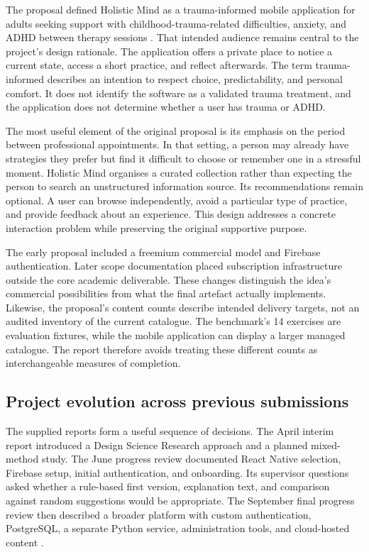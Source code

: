 The proposal defined Holistic Mind as a trauma-informed mobile application for adults seeking support with childhood-trauma-related difficulties, anxiety, and ADHD between therapy sessions \citep{shrestha2026a}. That intended audience remains central to the project's design rationale. The application offers a private place to notice a current state, access a short practice, and reflect afterwards. The term trauma-informed describes an intention to respect choice, predictability, and personal comfort. It does not identify the software as a validated trauma treatment, and the application does not determine whether a user has trauma or ADHD.

The most useful element of the original proposal is its emphasis on the period between professional appointments. In that setting, a person may already have strategies they prefer but find it difficult to choose or remember one in a stressful moment. Holistic Mind organises a curated collection rather than expecting the person to search an unstructured information source. Its recommendations remain optional. A user can browse independently, avoid a particular type of practice, and provide feedback about an experience. This design addresses a concrete interaction problem while preserving the original supportive purpose.

The early proposal included a freemium commercial model and Firebase authentication. Later scope documentation placed subscription infrastructure outside the core academic deliverable. These changes distinguish the idea's commercial possibilities from what the final artefact actually implements. Likewise, the proposal's content counts describe intended delivery targets, not an audited inventory of the current catalogue. The benchmark's 14 exercises are evaluation fixtures, while the mobile application can display a larger managed catalogue. The report therefore avoids treating these different counts as interchangeable measures of completion.

\subsection{Project evolution across previous submissions}

The supplied reports form a useful sequence of decisions. The April interim report introduced a Design Science Research approach and a planned mixed-method study. The June progress review documented React Native selection, Firebase setup, initial authentication, and onboarding. Its supervisor questions asked whether a rule-based first version, explanation text, and comparison against random suggestions would be appropriate. The September final progress review then described a broader platform with custom authentication, PostgreSQL, a separate Python service, administration tools, and cloud-hosted content \citep{shrestha2026b,shrestha2026c,shrestha2026d}.

